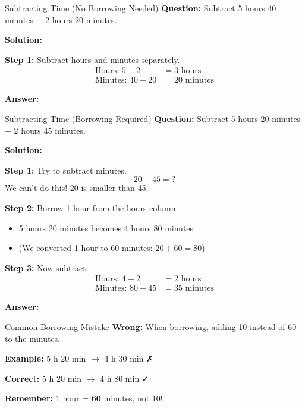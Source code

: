 \documentclass[12pt,a4paper]{article}
\begin{document}
\begin{examplebox}{Subtracting Time (No Borrowing Needed)}
\textbf{Question:} Subtract 5 hours 40 minutes $-$ 2 hours 20 minutes.

\textbf{Solution:}

\textbf{Step 1:} Subtract hours and minutes separately.
\begin{align*}
\text{Hours: } 5 - 2 &= 3\text{ hours} \\
\text{Minutes: } 40 - 20 &= 20\text{ minutes}
\end{align*}

\textbf{Answer:} 
\end{examplebox}

\begin{examplebox}{Subtracting Time (Borrowing Required)}
\textbf{Question:} Subtract 5 hours 20 minutes $-$ 2 hours 45 minutes.

\textbf{Solution:}

\textbf{Step 1:} Try to subtract minutes.
\[20 - 45 = ?\]
We can't do this! 20 is smaller than 45.

\textbf{Step 2:} Borrow 1 hour from the hours column.
\begin{itemize}
\item 5 hours 20 minutes becomes 4 hours 80 minutes
\item (We converted 1 hour to 60 minutes: $20 + 60 = 80$)
\end{itemize}

\textbf{Step 3:} Now subtract.
\begin{align*}
\text{Hours: } 4 - 2 &= 2\text{ hours} \\
\text{Minutes: } 80 - 45 &= 35\text{ minutes}
\end{align*}

\textbf{Answer:} 
\end{examplebox}

\begin{warningbox}{Common Borrowing Mistake}
\textbf{Wrong:} When borrowing, adding 10 instead of 60 to the minutes.

\textbf{Example:} 5 h 20 min $\rightarrow$ 4 h 30 min ✗

\textbf{Correct:} 5 h 20 min $\rightarrow$ 4 h 80 min ✓

\textbf{Remember:} 1 hour = \textbf{60} minutes, not 10!
\end{warningbox}
\end{document}
